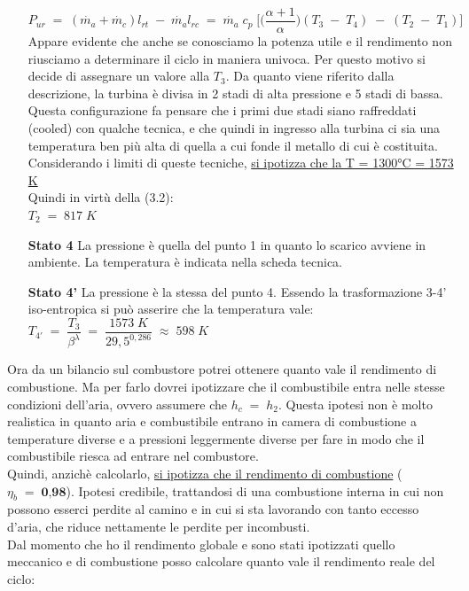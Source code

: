 \documentclass[a4paper, twoside, 12pt]{report}
\begin{document}
\begin{itemize}
	\begin{equation}
		P_{ur}\;=\;(\dot{m_{a}}+\dot{m_{c}})l_{rt}\;-\;\dot{m_{a}}l_{rc}\;=\;\dot{m_{a}}\;c_{p}\;\Biggr[\Biggr(\dfrac{\alpha +1}{\alpha}\Biggr)(T_{3}\;-\;T_{4})\;-\;(T_{2}\;-\;T_{1})\Biggr]
	\end{equation}
	Appare evidente che anche se conosciamo la potenza utile e il rendimento non riusciamo a determinare il ciclo in maniera univoca. Per questo motivo si decide di assegnare un valore alla $T_{3}$. Da quanto viene riferito dalla descrizione, la turbina è divisa in 2 stadi di alta pressione e 5 stadi di bassa. Questa configurazione fa pensare  che i primi due stadi siano raffreddati (cooled) con qualche tecnica, e che quindi in ingresso alla turbina ci sia una temperatura ben più alta di quella a cui fonde il metallo di cui è costituita. Considerando i limiti di queste tecniche, \uline{si ipotizza che la T = 1300°C = 1573 K}\\
	Quindi in virtù della (3.2):\\
	$T_{2}\;=\;817\;K$
	\item[\textbf{Stato 4  }] La pressione è quella del punto 1 in quanto lo scarico avviene in ambiente. La temperatura è indicata nella scheda tecnica. 
	\item[\textbf{Stato 4'}] La pressione è la stessa del punto 4. Essendo la trasformazione 3-4' iso-entropica si può asserire che la temperatura vale:\\
	$T_{4'}\;=\;\dfrac{T_{3}}{\beta^{\lambda}}\;=\;\dfrac{1573\;K}{29,5^{0,286}}\;\approx\;598\;K$
\end{itemize}
Ora da  un bilancio sul combustore potrei ottenere quanto vale il rendimento di combustione. Ma per farlo dovrei ipotizzare che il combustibile entra nelle stesse condizioni dell'aria, ovvero assumere che $h_{c}\;=\;h_{2}$. Questa ipotesi non è molto realistica in quanto aria e combustibile entrano in camera di combustione a temperature diverse e a pressioni leggermente diverse per fare in modo che il combustibile riesca ad entrare nel combustore.\\
Quindi, anzichè calcolarlo, \uline{si ipotizza che il rendimento di combustione} ($\eta_{b}\;=\;\textbf{0,98}$). Ipotesi credibile, trattandosi di una combustione interna in cui non possono esserci perdite al camino e in cui si sta lavorando con tanto eccesso d'aria, che riduce nettamente le perdite per incombusti.\\
Dal momento che ho il rendimento globale e sono stati ipotizzati quello meccanico e di combustione posso calcolare quanto vale il rendimento reale del ciclo:
\end{document}

